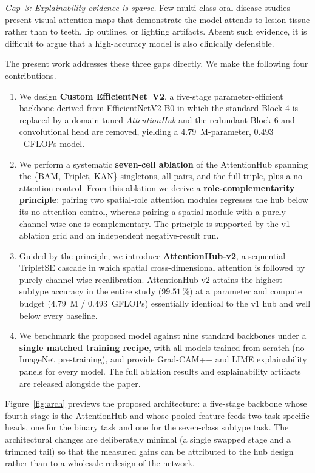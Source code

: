 \emph{Gap~3: Explainability evidence is sparse.} Few multi-class oral
disease studies present visual attention maps that demonstrate the model
attends to lesion tissue rather than to teeth, lip outlines, or lighting
artifacts. Absent such evidence, it is difficult to argue that a high-accuracy
model is also clinically defensible.

The present work addresses these three gaps directly. We make the following
four contributions.

\begin{enumerate}
  \item We design \textbf{Custom EfficientNet~V2}, a five-stage
  parameter-efficient backbone derived from EfficientNetV2-B0 in which the
  standard Block-4 is replaced by a domain-tuned \emph{AttentionHub} and the
  redundant Block-6 and convolutional head are removed, yielding a
  $4.79$~M-parameter, $0.493$~GFLOPs model.
  \item We perform a systematic \textbf{seven-cell ablation} of the
  AttentionHub spanning the \{BAM, Triplet, KAN\} singletons, all pairs, and
  the full triple, plus a no-attention control. From this ablation we derive a
  \textbf{role-complementarity principle}: pairing two spatial-role attention
  modules regresses the hub below its no-attention control, whereas pairing a
  spatial module with a purely channel-wise one is complementary. The principle
  is supported by the v1 ablation grid and an independent negative-result run.
  \item Guided by the principle, we introduce \textbf{AttentionHub-v2}, a
  sequential Triplet\arrowto{}SE cascade in which spatial cross-dimensional
  attention is followed by purely channel-wise recalibration.
  AttentionHub-v2 attains the highest subtype accuracy in the entire study
  ($99.51\,\%$) at a parameter and compute budget ($4.79$~M / $0.493$~GFLOPs)
  essentially identical to the v1 hub and well below every baseline.
  \item We benchmark the proposed model against nine standard backbones under
  a \textbf{single matched training recipe}, with all models trained from
  scratch (no ImageNet pre-training), and provide Grad-CAM++ and LIME
  explainability panels for every model. The full ablation results and
  explainability artifacts are released alongside the paper.
\end{enumerate}

Figure~\ref{fig:arch} previews the proposed architecture: a five-stage backbone
whose fourth stage is the AttentionHub and whose pooled feature feeds two
task-specific heads, one for the binary task and one for the seven-class
subtype task. The architectural changes are deliberately minimal (a single
swapped stage and a trimmed tail) so that the measured gains can be
attributed to the hub design rather than to a wholesale redesign of the
network.

